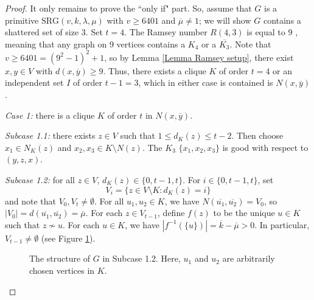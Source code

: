 \documentclass{article}
\newcommand\sm{\setminus}
\theoremstyle{definition}
\begin{document}
\begin{proof}
    It only remains to prove the ``only if" part. So, assume that $G$ is a primitive $\mathrm{SRG}(v,k,\lambda,\mu)$ with $v\ge6401$ and $\overline\mu\ne 1$; we will show $G$ contains a shattered set of size 3. Set $t=4$. The Ramsey number $R(4,3)$ is equal to $9$ \cite{greenwood1955combinatorial}, meaning that any graph on 9 vertices contains a $K_4$ or a $\overline{K_3}$. Note that $v\ge6401=(9^2-1)^2+1$, so by Lemma \ref{Lemma Ramsey setup}, there exist $x,y\in V$ with $d(x,\overline y)\ge 9$. Thus, there exists a clique $K$ of order $t=4$ or an independent set $I$ of order $t-1=3$, which in either case is contained is $N(x,\overline y)$. 

    \textit{Case 1:} there is a clique $K$ of order $t$ in $N(x,\overline y)$.

    \textit{Subcase 1.1:} there exists $z\in V$ such that $1\le d_K(z)\le t-2$. Then choose $x_1\in N_K(z)$ and $x_2,x_3\in K\sm N(z)$. The $K_3$ $\{x_1,x_2,x_3\}$ is good with respect to $(y,z,x)$.

    \textit{Subcase 1.2:} for all $z\in V$, $d_K(z)\in\{0,t-1,t\}$. For $i\in\{0,t-1,t\}$, set
    $$V_i=\{z\in V\sm K:d_K(z)=i\}$$
    and note that $V_0,V_t\ne\emptyset$. For all $u_1,u_2\in K$, we have $N(\overline{u_1},\overline{u_2})=V_0$, so $|V_0|=d(\overline{u_1},\overline{u_2})=\overline{\mu}$. For each $z\in V_{t-1}$, define $f(z)$ to be the unique $u\in K$ such that $z\not\sim u$. For each $u\in K$, we have $|f^{-1}(\{u\})|=\overline k-\overline\mu>0$. In particular, $V_{t-1}\ne\emptyset$ (see Figure \ref{Figure Subcase 1.2}).
    
\begin{figure} 
\begin{center}
\caption{The structure of $G$ in Subcase 1.2. Here, $u_1$ and $u_2$ are arbitrarily chosen vertices in $K$.} \label{Figure Subcase 1.2}
\end{center}
\end{figure}


\end{proof}
\end{document}
